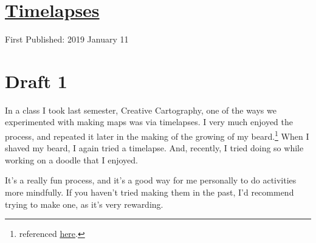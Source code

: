 \documentclass[12pt]{article}[titlepage]
\newcommand{\1}{\={a}}
\newcommand{\2}{\={e}}
\newcommand{\3}{\={\i}}
\newcommand{\4}{\=o}
\newcommand{\5}{\=u}
\newcommand{\6}{\={A}}
\renewcommand{\,}{\textsuperscript{,}}
\begin{document}
\doublespacing
\section{\href{timelapse.html}{Timelapses}}
First Published: 2019 January 11
\section{Draft 1}
In a class I took last semester, Creative Cartography, one of the ways we experimented with making maps was via timelapses.
I very much enjoyed the process, and repeated it later in the making of the growing of my beard.\footnote{referenced \href{growing-the-beard.html}{here}.}
When I shaved my beard, I again tried a timelapse.
And, recently, I tried doing so while working on a doodle that I enjoyed.

It's a really fun process, and it's a good way for me personally to do activities more mindfully.
If you haven't tried making them in the past, I'd recommend trying to make one, as it's very rewarding. 
\end{document}
